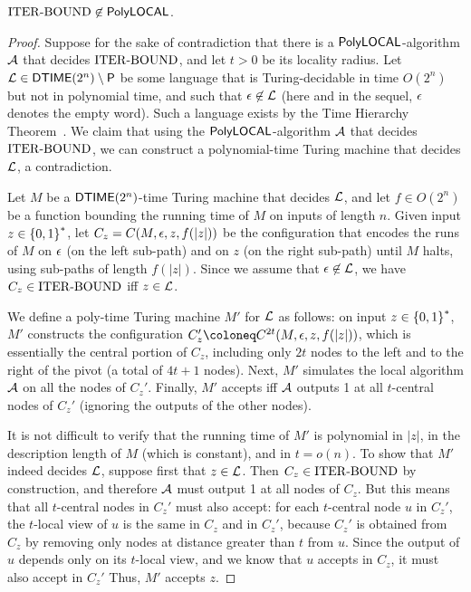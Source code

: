 \begin{claim}\label{claimITINLDP}
	${\mathrm{ITER\text{-}BOUND}} \not \in {\mathsf{PolyLOCAL}}$.
\end{claim}
\begin{proof}
Suppose for the sake of contradiction that there is a ${\mathsf{PolyLOCAL}}$-algorithm ${\mathcal{A}}$ that decides ${\mathrm{ITER\text{-}BOUND}}$,
and let $t > 0 $ be its locality radius.
Let $\mathcal{L} \in {\mathsf{DTIME}}(2^{n}) \setminus {\mathsf{P}}$ be some language that is Turing-decidable
in time $O(2^{n})$ but not in polynomial time,
and such that $\epsilon \not \in \mathcal{L}$ (here and in the sequel, $\epsilon$ denotes the empty word).
Such a language exists by the Time Hierarchy Theorem~\cite{hartmanis1965computational}.
We claim that using the ${\mathsf{PolyLOCAL}}$-algorithm ${\mathcal{A}}$ that decides ${\mathrm{ITER\text{-}BOUND}}$, we can construct a polynomial-time Turing machine
that decides $\mathcal{L}$, a contradiction.

Let $M$ be a ${\mathsf{DTIME}}(2^{n})$-time Turing machine that decides $\mathcal{L}$,
and let $f \in O(2^n)$ be a function bounding the running time of $M$ on inputs of length $n$.
Given input $z \in \left \{{0,1} \right \}^*$,
let $C_z = C(M,\epsilon,z,f(|z|))$
be the configuration that encodes the runs of $M$ on $\epsilon$ (on the left sub-path) and on $z$
(on the right sub-path)
until $M$ halts, using sub-paths of length $f(|z|)$.
Since we assume that $\epsilon \not \in \mathcal{L}$,
we have $C_z \in {\mathrm{ITER\text{-}BOUND}}$ iff $z \in \mathcal{L}$.

We define a poly-time Turing machine $M'$ for $\mathcal{L}$ as follows:
on input $z \in \left \{{0,1} \right \}^*$,
$M'$ constructs the configuration $C_z' \coloneq C^{2t}(M, \eps, z, f(|z|))$,
which is essentially the central portion of $C_z$, including only $2t$ 
nodes to the left and to the right of the pivot (a total of $4t+1$ nodes).
Next, $M'$ simulates the local algorithm ${\mathcal{A}}$
on all the nodes of $C_z'$.
Finally, $M'$ accepts iff ${\mathcal{A}}$ outputs 1 at all $t$-central nodes of $C_z'$
(ignoring the outputs of the other nodes).

It is not difficult to verify that the running time of $M'$ is polynomial in $|z|$,
in the description length of $M$ (which is constant),
and in $t = o(n)$.
To show that $M'$ indeed decides $\mathcal{L}$,
suppose first that $z \in \mathcal{L}$.
Then $C_z \in {\mathrm{ITER\text{-}BOUND}}$ by construction,
and therefore ${\mathcal{A}}$ must output 1 at all nodes of $C_z$.
But this means that all $t$-central nodes in $C_z'$ must also accept:
for each $t$-central node $u$ in $C_z'$,
the $t$-local view of $u$ is the same in $C_z$ and in $C_z'$,
because $C_z'$ is obtained from $C_z$ by removing only nodes at distance greater than $t$ from $u$.
Since the output of $u$ depends only on its $t$-local view,
and we know that $u$ accepts in $C_z$, it must also accept in $C_z'$
Thus, $M'$ accepts $z$.


\end{proof}
